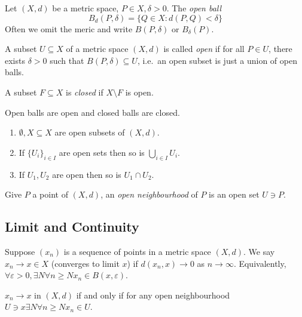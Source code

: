 \documentclass[a4paper]{article}
\begin{document}
Let $(X,d)$ be a metric space, $P\in X, \delta > 0$. The \emph{open ball}
\[
  B_d(P,\delta) = \{Q\in X: d(P,Q) < \delta\}
\]
Often we omit the meric and write $B(P,\delta)$ or $B_\delta(P)$.

\begin{definition}
  A subset $U \subseteq X$ of a metric space $(X,d)$ is called \emph{open} if for all \(P \in U\), there exists \(\delta > 0\) such that $B(P,\delta) \subseteq U$, i.e.\ an open subset is just a union of open balls.
\end{definition}

\begin{definition}
  A subset $F\subseteq X$ is \emph{closed} if $X\setminus F$ is open.
\end{definition}

Open balls are open and closed balls are closed.

\begin{lemma}\leavevmode
  \begin{enumerate}
  \item $\emptyset, X \subseteq X$ are open subsets of $(X,d)$.
  \item If $\{U_i\}_{i\in I}$ are open sets then so is $\bigcup_{i\in I} U_i$.
    \item If $U_1, U_2$ are open then so is $U_1 \cap U_2$.
  \end{enumerate}
\end{lemma}

\begin{definition}
  Give $P$ a point of $(X,d)$, an \emph{open neighbourhood} of $P$ is an open set $U \ni P$.
\end{definition}

\subsection{Limit and Continuity}

Suppose $(x_n)$ is a sequence of points in a metric space $(X,d)$. We say $x_n \to x\in X$ (converges to limit $x$) if $d(x_n,x) \to 0$ as $n \to \infty$. Equivalently, $\forall \varepsilon>0, \exists N \forall n\geq N x_n \in B(x, \varepsilon)$.

\begin{remark}
  $x_n \to x$ in $(X,d)$ if and only if for any open neighbourhood $U \ni x \exists N \forall n\geq N x_n \in U$. 
\end{remark}
\end{document}
